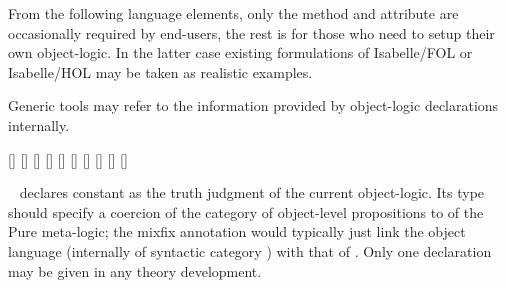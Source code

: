 \begin{isabellebody}
\begin{isamarkuptext}
  From the following language elements, only the \hyperlink{method.atomize}{\mbox{}}
  method and \hyperlink{attribute.rule-format}{\mbox{}} attribute are occasionally
  required by end-users, the rest is for those who need to setup their
  own object-logic.  In the latter case existing formulations of
  Isabelle/FOL or Isabelle/HOL may be taken as realistic examples.

  Generic tools may refer to the information provided by object-logic
  declarations internally.

  \begin{railoutput}
[]
[]
\rail@end
{}
[]
\rail@bar
{}
[]
[]
[]
\rail@endbar
\rail@end
{}
[]
\rail@bar
{}
[]
[]
[]
\rail@endbar
\rail@end
\end{railoutput}


  \begin{description}
  
  \item \hyperlink{command.judgment}{\mbox{}}~ declares constant
   as the truth judgment of the current object-logic.  Its
  type  should specify a coercion of the category of
  object-level propositions to  of the Pure meta-logic;
  the mixfix annotation  would typically just link the
  object language (internally of syntactic category )
  with that of .  Only one \hyperlink{command.judgment}{\mbox{}}
  declaration may be given in any theory development.
  

\end{description}
\end{isamarkuptext}
\end{isabellebody}

